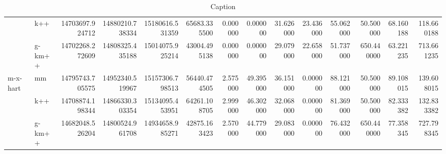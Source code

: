 \begin{table}[!ht]
{\begin{tabular}{llrrrrrrrrrrrr}
 & k++ & 14703697.924712 & 14880210.738334 & 15180616.531359 & 65683.335500 & 0.000000 & 0.000000 & 31.626000 & 23.436000 & 55.062000 & 50.500000 & 68.160188 & 118.660188 \\
 & g-km++ & 14702268.272609 & 14808325.435188 & 15014075.925214 & 43004.495138 & 0.000000 & 0.000000 & 29.079000 & 22.658000 & 51.737000 & 650.440000 & 63.221235 & 713.661235 \\
\cline{1-14}
\multirow[t]{3}{*}{m-x-hart} & mm & 14795743.705575 & 14952340.519967 & 15157306.798513 & 56440.474505 & 2.575000 & 49.395000 & 36.151000 & 0.000000 & 88.121000 & 50.500000 & 89.108015 & 139.608015 \\
 & k++ & 14708874.198344 & 14866330.303354 & 15134095.453951 & 64261.108705 & 2.999000 & 46.302000 & 32.068000 & 0.000000 & 81.369000 & 50.500000 & 82.333382 & 132.833382 \\
 & g-km++ & 14682048.526204 & 14800524.961708 & 14934658.985271 & 42875.163423 & 2.570000 & 44.779000 & 29.083000 & 0.000000 & 76.432000 & 650.440000 & 77.358345 & 727.798345 \\
\cline{1-14}
\hline
\end{tabular}
}

\caption{Caption}
\label{tab:my_label}
\end{table}